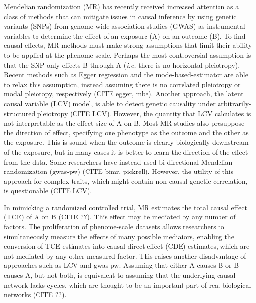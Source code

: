 \documentclass{article}
\begin{document}
Mendelian randomization (MR) has recently received increased attention as a class of methods
that can mitigate issues in causal inference
 by using genetic variants (SNPs) from genome-wide
association studies (GWAS) as instrumental variables to determine the effect
of an exposure (A) on an outcome (B). To find causal effects,
MR methods must make strong assumptions that limit their
ability to be applied at the phenome-scale. Perhaps the most
controversial assumption is that the SNP only effects B through A
(\textit{i.e.} there is no horizontal pleiotropy). Recent methods such as Egger
regression and the mode-based-estimator are able to relax this assumption, instead
assuming there is no correlated pleiotropy or modal pleiotopy, respectively (CITE egger, mbe).
Another approach, the latent causal variable (LCV) model, is able to detect genetic causality
under arbitrarily-structured pleiotropy (CITE LCV). However, the quantity that LCV
calculates is not interpretable as the effect size of A on B. Most MR studies
also presuppose the direction of effect, specifying one phenotype as the outcome and
the other as the exposure. This is sound when the outcome
is clearly biologically downstream of the exposure, but in many cases it is better
to learn the direction of the effect from the data. Some researchers have instead
used bi-directional Mendelian randomization (gwas-pw) (CITE bimr, pickrell).
However, the utility of this approach for complex traits,
which might contain non-causal genetic correlation,
is questionable (CITE LCV).

In mimicking a randomized controlled trial, MR estimates the
total causal effect (TCE) of A on B (CITE ??). This effect may be mediated by
any number of factors. The proliferation of phenome-scale datasets
allows researchers to simultaneously measure the effects of many possible mediators,
enabling the conversion of TCE estimates into causal direct effect (CDE)
estimates, which are not mediated by any other measured factor.
This raises another disadvantage of approaches such as LCV and gwas-pw. Assuming that either
A causes B or B causes A, but not both, is equivalent to assuming
that the underlying causal network
lacks cycles, which are thought to be an important part of real biological networks (CITE ??).
\end{document}

